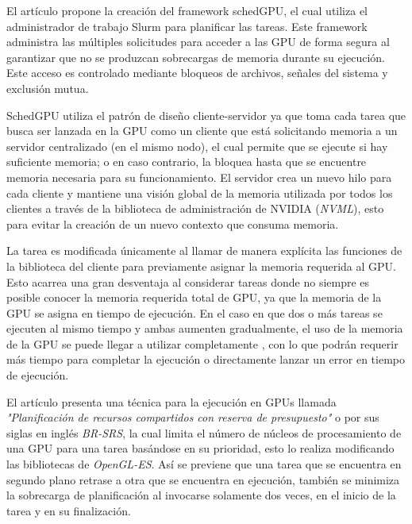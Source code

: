 El artículo \cite{IntraNode} propone la creación del framework schedGPU, el cual utiliza el administrador de trabajo Slurm para planificar las tareas. Este framework administra las múltiples solicitudes para acceder a las GPU de forma segura al garantizar que no se produzcan sobrecargas de memoria durante su ejecución. 
Este acceso es controlado mediante bloqueos de archivos, señales del sistema y exclusión mutua.
\newline

SchedGPU utiliza el patrón de diseño cliente-servidor ya que toma cada tarea que busca ser lanzada en la GPU como un cliente que está solicitando memoria a un servidor centralizado (en el mismo nodo), el cual permite que se ejecute si hay suficiente memoria; o en caso contrario, la bloquea hasta que se encuentre memoria necesaria para su funcionamiento. 
El servidor crea un nuevo hilo para cada cliente y mantiene una visión global de la memoria utilizada por todos los clientes a través de la biblioteca de administración de NVIDIA (\textit{NVML}), esto para evitar la creación de un nuevo contexto que consuma memoria.
\newline

La tarea es modificada únicamente al llamar  de manera explícita las funciones de la biblioteca del cliente para previamente asignar la memoria requerida al GPU. Esto acarrea una gran desventaja al considerar tareas donde no siempre es posible conocer la memoria requerida total de GPU, ya que la memoria de la GPU se asigna en tiempo de ejecución. 
En el caso en que dos o más tareas se ejecuten al mismo tiempo y ambas aumenten gradualmente, el uso de la memoria de la GPU se puede llegar a utilizar completamente , con lo que podrán requerir más tiempo para completar la ejecución o directamente lanzar un error en tiempo de ejecución.
\newline	
	
	El artículo \cite{Pridriven} presenta una técnica para la ejecución en GPUs llamada \textit{"Planificación de recursos compartidos con reserva de presupuesto"} o por sus siglas en inglés \textit{BR-SRS}, la cual limita el número de núcleos de procesamiento de una GPU para una tarea basándose en su prioridad, esto lo realiza modificando las bibliotecas de  \textit{OpenGL-ES}. 
	Así se previene que una tarea que se encuentra en segundo plano retrase a otra que se encuentra en ejecución, también se minimiza la sobrecarga de planificación al invocarse solamente dos veces, en el inicio de la tarea y en su finalización.
\newline

